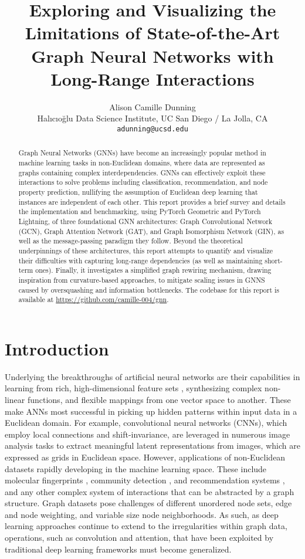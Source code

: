 \documentclass[11pt]{article}
\title{Exploring and Visualizing the Limitations of State-of-the-Art Graph Neural Networks with Long-Range Interactions}
\author{Alison Camille Dunning \\
  Halıcıoğlu Data Science Institute, UC San Diego / La Jolla, CA \\
  {\tt adunning@ucsd.edu}}
\date{}
\begin{document}
\maketitle
\begin{abstract}
    Graph Neural Networks (GNNs) have become an increasingly popular method in machine learning tasks in non-Euclidean domains, where data are represented as graphs containing complex interdependencies. GNNs can effectively exploit these interactions to solve problems including classification, recommendation, and node property prediction, nullifying the assumption of Euclidean deep learning that instances are independent of each other. This report provides a brief survey and details the implementation and benchmarking, using PyTorch Geometric and PyTorch Lightning, of three foundational GNN architectures: Graph Convolutional Network (GCN), Graph Attention Network (GAT), and Graph Isomorphism Network (GIN), as well as the message-passing paradigm they follow. Beyond  the theoretical underpinnings of these architectures, this report attempts to quantify and visualize their difficulties with capturing long-range dependencies (as well as maintaining short-term ones). Finally, it investigates a simplified graph rewiring mechanism, drawing inspiration from curvature-based approaches, to mitigate scaling issues in GNNS caused by oversquashing and information bottlenecks. The codebase for this report is available at \url{https://github.com/camille-004/gnn}.
\end{abstract}

\section{Introduction}

Underlying the breakthroughs of artificial neural networks are their capabilities in learning from rich, high-dimensional feature sets \cite{article}, synthesizing complex non-linear functions, and flexible mappings from one vector space to another. These make ANNs most successful in picking up hidden patterns within input data in a Euclidean domain. For example, convolutional neural networks (CNNs), which employ local connections and shift-invariance, are leveraged in numerous image analysis tasks to extract meaningful latent representations from images, which are expressed as grids in Euclidean space. However, applications of non-Euclidean datasets rapidly developing in the machine learning space. These include molecular fingerprints \cite{https://doi.org/10.48550/arxiv.1509.09292}, community detection \cite{9722614}, and recommendation systems \cite{https://doi.org/10.48550/arxiv.2109.12843}, and any other complex system of interactions that can be abstracted by a graph structure. Graph datasets pose challenges of different unordered node sets, edge and node weighting, and variable size node neighborhoods. As such, as deep learning approaches continue to extend to the irregularities within graph data, operations, such as convolution and attention, that have been exploited by traditional deep learning frameworks must become generalized.
\end{document}

